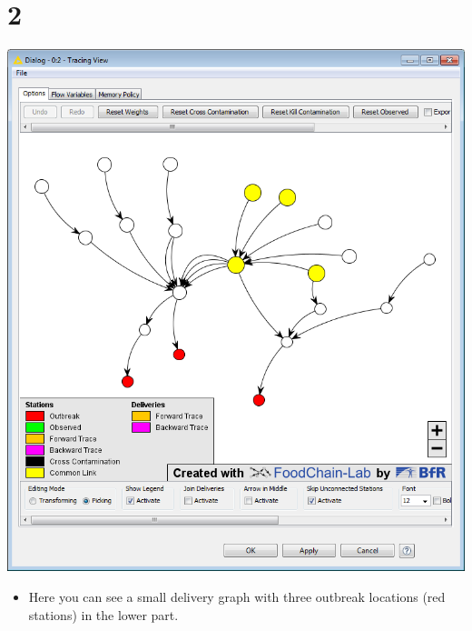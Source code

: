 \documentclass{beamer}
\begin{document}
\section{2}
\begin{frame}
	\begin{center}
  		\includegraphics[height=0.6\textheight]{2.png}
	\end{center}
	\begin{itemize}
		\item Here you can see a small delivery graph with three outbreak locations (red stations) in the lower part.
	\end{itemize}
\end{frame}
\end{document}

